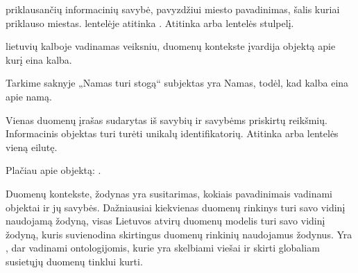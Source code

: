 \documentclass[letterpaper,10pt,lithuanian]{sphinxmanual}
\begin{document}
\begin{description}
\sphinxAtStartPar
{\hyperref[\detokenize{savokos:term-modelis}]{}} priklausančių informacinių
{\hyperref[\detokenize{savokos:term-objektas}]{}} savybė, pavyzdžiui miesto pavadinimas, šalis
kuriai priklauso miestas. {\hyperref[\detokenize{savokos:term-DSA}]{}} lentelėje atitinka
{\hyperref[\detokenize{formatas:property}]{}}. Atitinka  arba lentelės stulpelį.

\sphinxAtStartPar
{} lietuvių kalboje vadinamas veiksniu, duomenų kontekste
įvardija objektą apie kurį eina kalba.

\sphinxAtStartPar
Tarkime saknyje „Namas turi stogą“ subjektas yra Namas, todėl, kad
kalba eina apie namą.

\sphinxAtStartPar
Vienas duomenų įrašas sudarytas iš savybių ir savybėms priskirtų
reikšmių. Informacinis objektas turi turėti unikalų identifikatorių.
Atitinka  arba lentelės vieną eilutę.

\sphinxAtStartPar
Plačiau apie objektą: {\hyperref[\detokenize{modelis:objektas}]{}}.

\sphinxAtStartPar
Duomenų kontekste, žodynas yra susitarimas, kokiais pavadinimais
vadinami objektai ir jų savybės. Dažniausiai kiekvienas duomenų rinkinys
turi savo vidinį naudojamą žodyną, visas Lietuvos atvirų duomenų modelis
turi savo vidinį žodyną, kuris suvienodina skirtingus duomenų rinkinių
naudojamus žodynus. Yra {\hyperref[\detokenize{savokos:term-viesasis-zodynas}]{}}, dar
vadinami ontologijomis, kurie yra skelbiami viešai ir skirti globaliam
susietųjų duomenų tinklui kurti.


\end{description}
\end{document}
